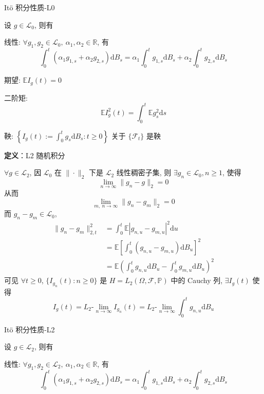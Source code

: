 \documentclass[openany]{ctexbook}
\theoremstyle{kaiti}
\theoremstyle{normal}
\begin{document}
It\"o 积分性质-L0

设 $g\in\mathcal{L}_0$, 则有

线性: $\forall g_1,g_2\in\mathcal{L}_0,~\alpha_1,\alpha_2\in\mathbb{R}$, 有
\begin{equation}
  \int_0^t(\alpha_1g_{1,s}+\alpha_2g_{2,s})\mathrm{d}B_s=\alpha_1\int_0^tg_{1,s}\mathrm{d}B_s+\alpha_2\int_0^tg_{2,s}\mathrm{d}B_s
\end{equation}

期望: $\mathbb{E}I_g(t)=0$

二阶矩:
\begin{equation}
  \mathbb{E}I_g^2(t)=\int_0^t\mathbb{E}g_s^2\mathrm{d}s
\end{equation}

鞅: $\displaystyle\left\{I_g(t):=\int_0^tg_s\mathrm{d}B_s:t\geqslant0\right\}$ 关于 $\{\mathcal{F}_t\}$ 是鞅

\textbf{定义}：L2 随机积分

$\forall g\in\mathcal{L}_2$, 因 $\mathcal{L}_0$ 在 $\|\cdot\|_2$ 下是 $\mathcal{L}_2$ 线性稠密子集, 则 $\exists g_n\in\mathcal{L}_0,n\geqslant1$, 使得
\begin{equation}
  \lim_{n\to\infty}\|g_n-g\|_2=0
\end{equation}
从而
\begin{equation}
  \lim_{m,~n\to\infty}\|g_n-g_m\|_2=0
\end{equation}
而 $g_n-g_m\in\mathcal{L}_0$, 
\begin{equation}
  \begin{aligned}
    \|g_n-g_m\|_{2,t}^2&=\int_0^t\mathbb{E}|g_{n,u}-g_{m,u}|^2\mathrm{d}u\\
    &=\mathbb{E}\left[\int_0^t(g_{n,u}-g_{m,u})\mathrm{d}B_u\right]^2\\
    &=\mathbb{E}\left(\int_0^tg_{n,u}\mathrm{d}B_u-\int_0^tg_{m,u}\mathrm{d}B_u\right)^2
  \end{aligned}
\end{equation} 可见 $\forall t\geqslant0$, $\{I_{g_n}(t):n\geqslant0\}$ 是 $H=L_2(\Omega,\mathcal{F},\mathbb{P})$ 中的 Cauchy 列, $\exists I_g(t)$ 使得
\begin{equation}
  I_g(t)=L_2\text{-}\lim_{n\to\infty}I_{g_n}(t)=L_2\text{-}\lim_{n\to\infty}\int_0^tg_{n,u}\mathrm{d}B_u
\end{equation}

It\"o 积分性质-L2

设 $g\in\mathcal{L}_2$, 则有

线性: $\forall g_1,g_2\in\mathcal{L}_2,~\alpha_1,\alpha_2\in\mathbb{R}$, 有
\begin{equation}
  \int_0^t(\alpha_1g_{1,s}+\alpha_2g_{2,s})\mathrm{d}B_s=\alpha_1\int_0^tg_{1,s}\mathrm{d}B_s+\alpha_2\int_0^tg_{2,s}\mathrm{d}B_s
\end{equation}
\end{document}

